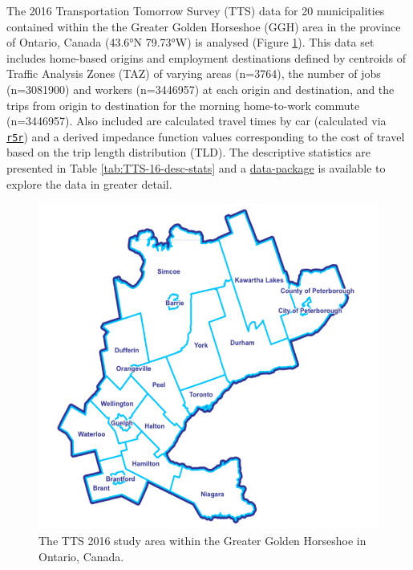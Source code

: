 \documentclass[]{elsarticle} %
\begin{document}
The 2016 Transportation Tomorrow Survey (TTS) data for 20 municipalities
contained within the the Greater Golden Horseshoe (GGH) area in the
province of Ontario, Canada (43.6°N 79.73°W) is analysed (Figure
\ref{fig:TTS-16-survey-area}). This data set includes home-based origins
and employment destinations defined by centroids of Traffic Analysis
Zones (TAZ) of varying areas (n=3764), the number of jobs (n=3081900)
and workers (n=3446957) at each origin and destination, and the trips
from origin to destination for the morning home-to-work commute
(n=3446957). Also included are calculated travel times by car
(calculated via \href{https://github.com/ipeaGIT/r5r}{\texttt{r5r}}) and
a derived impedance function values corresponding to the cost of travel
based on the trip length distribution (TLD). The descriptive statistics
are presented in Table \ref{tab:TTS-16-desc-stats} and a
\href{https://github.com/soukhova/AccessPack}{data-package} is available
to explore the data in greater detail.

\begin{figure}
\includegraphics[width=1\linewidth]{images/Greater-Golden-Horseshoe-Map} \caption{\label{fig:TTS-16-survey-area}The TTS 2016 study area within the Greater Golden Horseshoe in Ontario, Canada.}\label{fig:TTS-16-survey-area}
\end{figure}
\end{document}

